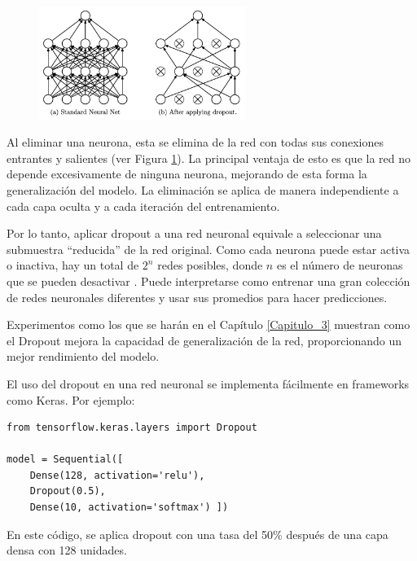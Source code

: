 \begin{figure}[H]
    \centering
    \includegraphics[width=0.6\textwidth]{img/dropout.png}
    \label{fig:dropout}
\end{figure}
    
Al eliminar una neurona, esta se elimina de la red con todas sus conexiones entrantes y salientes (ver Figura \ref{fig:dropout}). La principal ventaja de esto es que la red no depende excesivamente de ninguna neurona, mejorando de esta forma la generalización del modelo. La eliminación se aplica de manera independiente a cada capa oculta y a cada iteración del entrenamiento. 


Por lo tanto, aplicar dropout a una red neuronal equivale a seleccionar una submuestra ``reducida'' de la red original. Como cada neurona puede estar activa o inactiva, hay un total de $2^n$ redes posibles, donde $n$ es el número de neuronas que se pueden desactivar \citep{srivastava2013improving}. Puede interpretarse como entrenar una gran colección de redes neuronales diferentes y usar sus promedios para hacer predicciones.


Experimentos como los que se harán en el Capítulo \ref{Capitulo_3} muestran como el Dropout mejora la capacidad de generalización de la red, proporcionando un mejor rendimiento del modelo.


El uso del dropout en una red neuronal se implementa fácilmente en frameworks como Keras. Por ejemplo:

\lstset{language=Python}
\begin{lstlisting}
from tensorflow.keras.layers import Dropout

model = Sequential([
    Dense(128, activation='relu'),
    Dropout(0.5),
    Dense(10, activation='softmax') ])
\end{lstlisting}

En este código, se aplica dropout con una tasa del 50\% después de una capa densa con 128 unidades.



